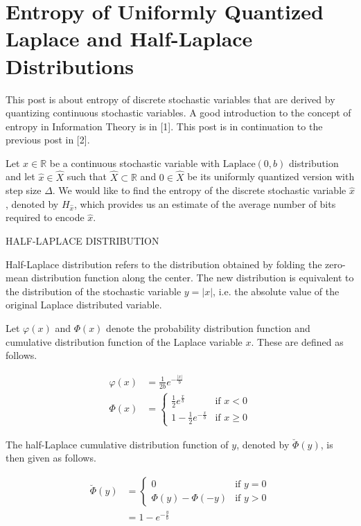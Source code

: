 \section{Entropy of Uniformly Quantized Laplace and Half-Laplace Distributions}

This post is about entropy of discrete stochastic variables that are derived by quantizing continuous stochastic variables. A good introduction to the concept of entropy in Information Theory is in [1]. This post is in continuation to the previous post in [2].

Let $x \in \mathbb{R}$ be a continuous stochastic variable with $\text{Laplace}(0, b)$ distribution and let $\hat{x} \in \hat{X}$ such that $\hat{X} \subset \mathbb{R}$ and $0 \in \hat{X}$ be its uniformly quantized version with step size $\Delta$. We would like to find the entropy of the discrete stochastic variable $\hat{x}$, denoted by $H_{\hat{x}}$, which provides us an estimate of the average number of bits required to encode $\hat{x}$.

HALF-LAPLACE DISTRIBUTION

Half-Laplace distribution refers to the distribution obtained by folding the zero-mean distribution function along the center. The new distribution is equivalent to the distribution of the stochastic variable $y = |x|$, i.e. the absolute value of the original Laplace distributed variable.

Let $\varphi(x)$ and $\Phi(x)$ denote the probability distribution function and cumulative distribution function of the Laplace variable $x$. These are defined as follows.

\begin{align}\varphi(x) &= \frac{1}{2b} e^{-\frac{|x|}{b}} \\ \Phi(x) &= \begin{cases} \frac{1}{2} e^{\frac{x}{b}} & \text{if $x < 0$} \\ 1 - \frac{1}{2} e^{-\frac{x}{b}} & \text{if $x \geq 0$}\end{cases}\end{align}

The half-Laplace cumulative distribution function of $y$, denoted by $\breve{\Phi}(y)$, is then given as follows.

\begin{align} \breve{\Phi}(y) &= \begin{cases} 0 & \text{if $y = 0$} \\ \Phi(y) - \Phi(-y) & \text{if $y > 0$}\end{cases} \\ &= 1 - e^{-\frac{y}{b}} \label{eqn:le} \end{align}


